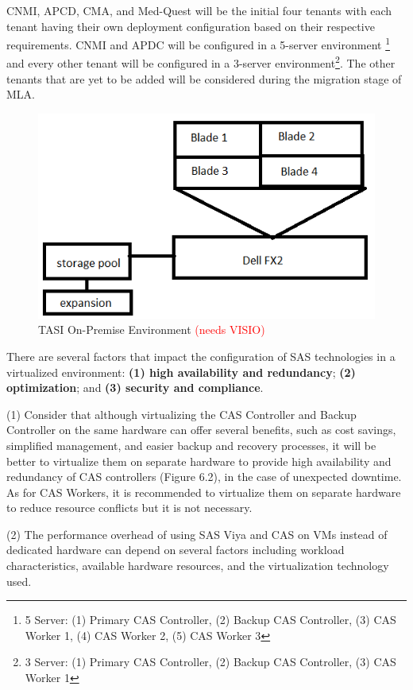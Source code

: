 CNMI, APCD, CMA, and Med-Quest will be the initial four tenants with each tenant having their own  deployment configuration based on their respective requirements. CNMI and APDC will be configured in a 5-server environment \footnote{5 Server: (1) Primary CAS Controller, (2) Backup CAS Controller, (3) CAS Worker 1, (4) CAS Worker 2, (5) CAS Worker 3} and every other tenant will be configured in a 3-server environment\footnote{3 Server: (1) Primary CAS Controller, (2) Backup CAS Controller, (3) CAS Worker 1}. The other tenants that are yet to be added will be considered during the migration stage of MLA. 

\begin{figure}[H]
    \centering
    \includegraphics[scale = 0.75]{images/currentENV.png}
    \caption{TASI On-Premise Environment \textcolor{red}{(needs VISIO)} }
    \label{Current ENV}
\end{figure}

There are several factors that impact the configuration of SAS technologies in a virtualized environment:  \textbf{(1) high availability and redundancy}; \textbf{(2) optimization}; and \textbf{(3) security and compliance}. 

(1) Consider that although virtualizing the CAS Controller and Backup Controller on the same hardware can offer several benefits, such as cost savings, simplified management, and easier backup and recovery processes, it will be better to virtualize them on separate hardware to provide high availability and redundancy of CAS controllers (Figure 6.2), in the case of unexpected downtime. As for CAS Workers, it is recommended to virtualize them on separate hardware to reduce resource conflicts but it is not necessary. 

(2) The performance overhead of using SAS Viya and CAS on VMs instead of dedicated hardware can depend on several factors including workload characteristics, available hardware resources, and the virtualization technology used.

